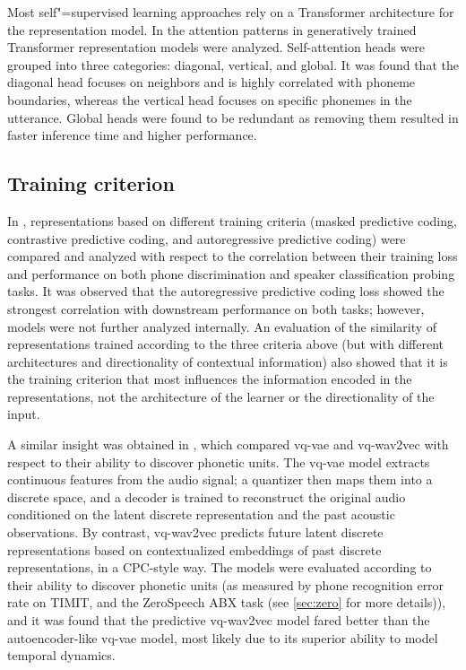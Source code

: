Most self"=supervised learning approaches rely on a Transformer architecture for
the representation model. In \parencite{yang_understanding_2020} the attention patterns in
generatively trained Transformer representation models were analyzed.
Self-attention heads were grouped into three categories: diagonal, vertical,
and global. It was found that the diagonal head focuses on neighbors and is
highly correlated with phoneme boundaries, whereas the vertical head focuses on
specific phonemes in the utterance. Global heads were found to be redundant as
removing them resulted in faster inference time and higher performance.

\subsection{Training criterion}
In \parencite{chung_similarity_2021}, representations based on different training criteria
(masked predictive coding, contrastive predictive coding, and autoregressive
predictive coding) were compared  and analyzed with respect to the correlation
between their training loss and performance on both phone discrimination and
speaker classification probing tasks. It was observed that the autoregressive
predictive coding loss showed the strongest correlation with downstream
performance on both tasks; however, models were not further analyzed
internally. An evaluation of the similarity of representations trained
according to the three criteria above (but with different architectures and
directionality of contextual information) also showed that it is the training
criterion that most influences the information encoded in the representations,
not the architecture of the learner or the directionality of the input. 

A similar insight was obtained in \parencite{zhou_comparison_2020}, which compared vq-vae and
vq-wav2vec with respect to their ability to discover phonetic units.
The vq-vae model extracts continuous features from the audio signal; a
quantizer then  maps them into a discrete space, and a decoder is trained to
reconstruct the original audio conditioned on the latent discrete
representation and the past acoustic observations. By contrast, vq-wav2vec
predicts future latent discrete representations based on contextualized
embeddings of past discrete representations, in a CPC-style way. The models
were evaluated according to their ability to discover phonetic units (as
measured by phone recognition error rate on TIMIT, and the ZeroSpeech ABX task
(see \cref{sec:zero} for more details)), and it was found that the predictive vq-wav2vec
model fared better than the autoencoder-like vq-vae model, most likely due to
its superior ability to model temporal dynamics.

